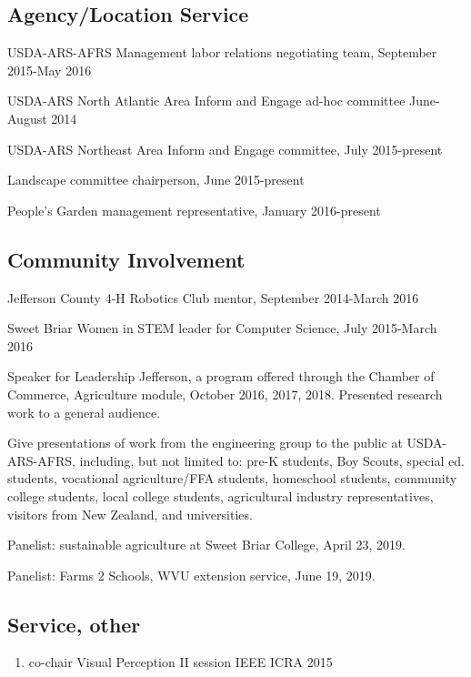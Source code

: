 \documentclass[letterpaper,11pt]{article}
\begin{document}
\subsection{Agency/Location Service}
\begin{enumerate}[noitemsep, leftmargin=*,label={[\arabic*]}]
\item{USDA-ARS-AFRS Management labor relations negotiating team, September 2015-May 2016}
\item{USDA-ARS North Atlantic Area Inform and Engage ad-hoc committee June-August 2014}
\item{USDA-ARS Northeast Area Inform and Engage committee, July 2015-present}
\item{Landscape committee chairperson, June 2015-present}
\item{People's Garden management representative, January 2016-present}
\end{enumerate}

\subsection{Community Involvement}
\begin{enumerate}[noitemsep, leftmargin=*,label={[\arabic*]}]
\item{Jefferson County 4-H Robotics Club mentor, September 2014-March 2016}
\item{Sweet Briar Women in STEM leader for Computer Science, July 2015-March 2016}
\item{Speaker for Leadership Jefferson, a program offered through the Chamber of Commerce, Agriculture module, October 2016, 2017, 2018.  Presented research work to a general audience.}
\item{Give presentations of work from the engineering group to the public at USDA-ARS-AFRS, including, but not limited to: pre-K students, Boy Scouts, special ed. students, vocational agriculture/FFA students, homeschool students, community college students, local college students, agricultural industry representatives, visitors from New Zealand, and universities.}
\item{Panelist: sustainable agriculture at Sweet Briar College, April 23, 2019.}
\item{Panelist: Farms 2 Schools, WVU extension service, June 19, 2019.}
\end{enumerate}


\subsection{Service, other}
\begin{enumerate}[noitemsep, leftmargin=*,label={}]
\item{co-chair Visual Perception II session IEEE ICRA 2015}
\end{enumerate}
\end{document}
